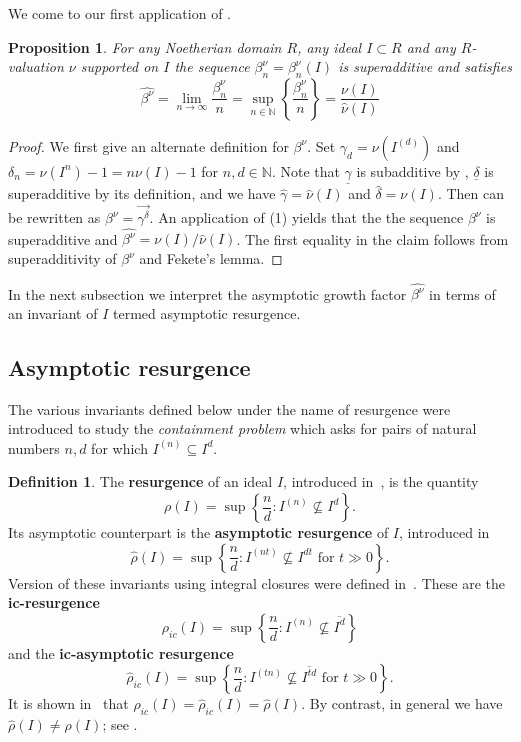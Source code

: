 \documentclass[12pt, reqno]{amsart}
\numberwithin{equation}{section}
\def\b{\ensuremath{\beta}}
\newcommand{\wrho}{\widehat{\rho}}
\newcommand{\N}{{\mathbb N}}
\theoremstyle{plain} %
\newtheorem{prop}[thm]{Proposition}
\theoremstyle{definition}
\newtheorem{defn}[thm]{Definition}
\theoremstyle{remark}
\begin{document}

We come to our first application of . 

\begin{prop}\label{lem:valuationLimit}
For any Noetherian domain $R$, any ideal $I\subset R$ and any $R$-valuation $\nu$ supported on $I$ the sequence $\beta^{\nu}_n=\beta^{\nu}_n(I)$ is superadditive and satisfies
\[
\widehat{\b^\nu}=\lim_{n\to\infty}\frac{\beta^\nu_n}{n}=\sup_{n\in\N}\left\lbrace \frac{\beta_n^{\nu}}{n}\right\rbrace=\frac{\nu(I)}{\widehat{\nu}(I)}
\]
\end{prop}
\begin{proof}
We first give an alternate definition for $\beta^\nu$. Set $\gamma_d=\nu(I^{(d)})$ and $\delta_n=\nu(I^n)-1=n\nu(I)-1$ for $n,d\in \N$. Note that $\underline{\gamma}$ is subadditive by , $\underline{\delta}$ is superadditive by its definition, and we have $\widehat{\gamma}=\widehat{\nu}(I)$ and $\widehat{\delta}=\nu(I)$. Then  can be rewritten as $\beta^\nu=\overrightarrow{\gamma^\delta}$.  An application of  (1) yields that the the sequence $\beta^{\nu}$ is superadditive and $\widehat{\b^\nu}=\nu(I)/\widehat{\nu}(I)$. The first equality  in the claim follows from superadditivity of $\beta^{\nu}$ and Fekete's lemma.  
\end{proof}

In the next subsection we interpret the asymptotic growth factor $\widehat{\b^\nu}$ in terms of an invariant of $I$ termed asymptotic resurgence.

\subsection{Asymptotic resurgence}
\label{s:resurgence}
The various invariants defined below under the name of resurgence were introduced  to study the {\em containment problem} which asks for pairs of natural numbers $n,d$ for which $I^{(n)}\subseteq I^d$.

\label{sec:resurgence}
\begin{defn}
The {\bf resurgence} of an ideal $I$, introduced in~\cite{BH10}, is the quantity
\[
\rho(I)=\sup\left\{\frac{n}{d} : I^{(n)}\not\subseteq I^d \right\}.
\]
Its asymptotic counterpart is the {\bf asymptotic resurgence} of $I$, introduced in~\cite{GHV13}
\[
\wrho(I)=\sup\left\{\frac{n}{d} : I^{(nt)}\not\subseteq I^{dt} \text{ for } t\gg 0 \right\}.
\]
Version of these invariants using integral closures were defined in~\cite{DFMS}.  These are the {\bf ic-resurgence}
\[
\rho_{ic}(I)=\sup\left\{\frac{n}{d} : I^{(n)}\not\subseteq \overline{I^d} \right\}
\]
and the {\bf ic-asymptotic resurgence}
\[
\wrho_{ic}(I)=\sup\left\{\frac{n}{d} : I^{(tn)}\not\subseteq \overline{I^{td}} \text{ for } t\gg 0 \right\}.
\]
  It is shown in~\cite[Corollary~4.14]{DFMS} that $\rho_{ic}(I)=\wrho_{ic}(I)=\wrho(I)$.  By contrast, in general we have $\wrho(I)\neq \rho(I)$; see \cite{DHNST15}.
\end{defn}
\end{document}
